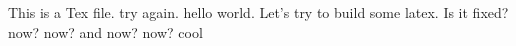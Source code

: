 \documentclass[]{article}
\begin{document}
This is a Tex file. try again.
hello world. Let's try to build some latex.
Is it fixed? now? now? and now? now? cool
\end{document}
